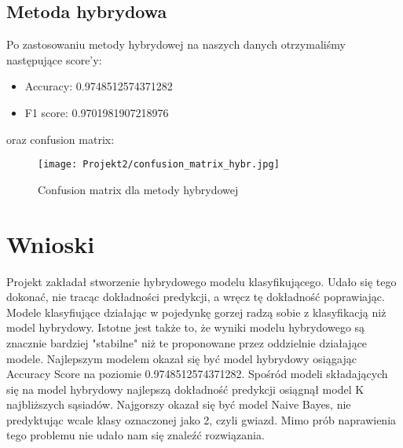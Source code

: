 \documentclass{article}
\begin{document}
\subsection{Metoda hybrydowa}
Po zastosowaniu metody hybrydowej na naszych danych otrzymaliśmy następujące score'y:

\begin{itemize}
    \item Accuracy: 0.9748512574371282
    \item F1 score: 0.9701981907218976
\end{itemize}
oraz confusion matrix:
\begin{figure}[H]
    \centering
    \texttt{[image: Projekt2/confusion\_matrix\_hybr.jpg]}
    \caption{Confusion matrix dla metody hybrydowej}
    \label{fig:enter-label}
\end{figure}

\section{Wnioski}
Projekt zakładał stworzenie hybrydowego modelu klasyfikującego. Udało się tego dokonać, nie tracąc dokładności predykcji, a wręcz tę dokładność poprawiając. Modele klasyfiujące działając w pojedynkę gorzej radzą sobie z klasyfikacją niż model hybrydowy. Istotne jest także to, że wyniki modelu hybrydowego są znacznie bardziej "stabilne" niż te proponowane przez oddzielnie działające modele. Najlepszym modelem okazał się być model hybrydowy osiągając Accuracy Score na poziomie 0.9748512574371282. Spośród modeli składających się na model hybrydowy najlepszą dokładność predykcji osiągnął model K najbliższych sąsiadów. Najgorszy okazał się być model Naive Bayes, nie predyktując wcale klasy oznaczonej jako 2, czyli gwiazd. Mimo prób naprawienia tego problemu nie udało nam się znaleźć rozwiązania.
\end{document}

